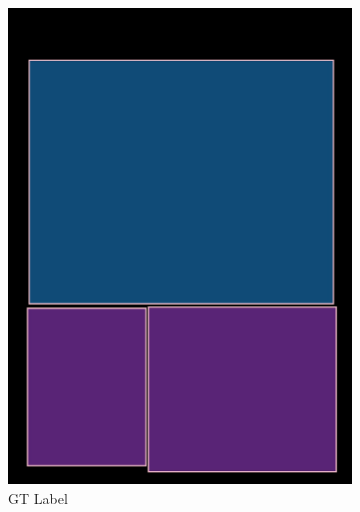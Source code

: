 \documentclass[aspectratio=1610]{beamer}
\begin{document}
\begin{frame}
\begin{figure}
\begin{subfigure}{.25\textwidth}
  \includegraphics[width=0.99\linewidth, clip=true, trim = 0mm 0mm 0mm 0mm]{figures/bbox/Jd55Bvg.jpg}
  \caption{GT Label}
\end{subfigure}%
\begin{subfigure}{.25\textwidth}
  \centering

\end{subfigure}
\end{figure}
\end{frame}
\end{document}
